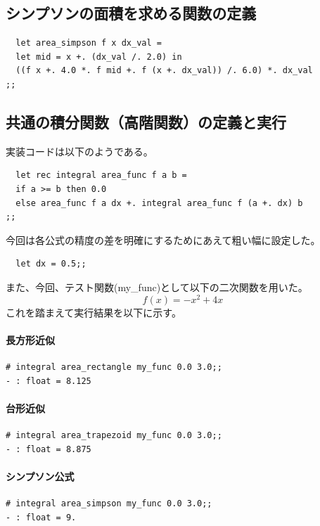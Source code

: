 \documentclass[titlepage]{ltjsarticle}
\begin{document}
\subsection{シンプソンの面積を求める関数の定義}
\begin{verbatim}
  let area_simpson f x dx_val =
  let mid = x +. (dx_val /. 2.0) in
  ((f x +. 4.0 *. f mid +. f (x +. dx_val)) /. 6.0) *. dx_val
;;
\end{verbatim}

\subsection{共通の積分関数（高階関数）の定義と実行}
実装コードは以下のようである。
\begin{verbatim}
  let rec integral area_func f a b =
  if a >= b then 0.0
  else area_func f a dx +. integral area_func f (a +. dx) b
;;
\end{verbatim}
今回は各公式の精度の差を明確にするためにあえて粗い幅に設定した。
\begin{verbatim}
  let dx = 0.5;;
\end{verbatim}
また、今回、テスト関数(my\_func)として以下の二次関数を用いた。
\begin{equation}
  f(x)=-x^2 + 4x
\end{equation}
これを踏まえて実行結果を以下に示す。

\paragraph{長方形近似}
\begin{verbatim}
# integral area_rectangle my_func 0.0 3.0;;
- : float = 8.125
\end{verbatim}

\paragraph{台形近似}
\begin{verbatim}
# integral area_trapezoid my_func 0.0 3.0;;
- : float = 8.875
\end{verbatim}

\paragraph{シンプソン公式}
\begin{verbatim}
# integral area_simpson my_func 0.0 3.0;;
- : float = 9.
\end{verbatim}
\end{document}
